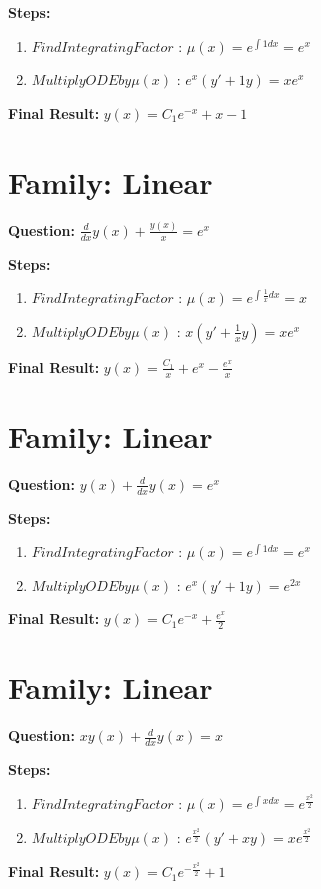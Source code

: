 \documentclass{article}
\begin{document}
\textbf{Steps:}
\begin{enumerate}
\item $Find Integrating Factor$ :  $\mu(x) = e^{\int 1 dx} = e^{x}$
\item $Multiply ODE by \mu(x)$ :  $e^{x}(y' + 1y) = x e^{x}$
\end{enumerate}
\textbf{Final Result:} $y{\left(x \right)} = C_{1} e^{- x} + x - 1$

\section*{Family: Linear}
\textbf{Question:} $\frac{d}{d x} y{\left(x \right)} + \frac{y{\left(x \right)}}{x} = e^{x}$

\textbf{Steps:}
\begin{enumerate}
\item $Find Integrating Factor$ :  $\mu(x) = e^{\int \frac{1}{x} dx} = x$
\item $Multiply ODE by \mu(x)$ :  $x(y' + \frac{1}{x}y) = x e^{x}$
\end{enumerate}
\textbf{Final Result:} $y{\left(x \right)} = \frac{C_{1}}{x} + e^{x} - \frac{e^{x}}{x}$

\section*{Family: Linear}
\textbf{Question:} $y{\left(x \right)} + \frac{d}{d x} y{\left(x \right)} = e^{x}$

\textbf{Steps:}
\begin{enumerate}
\item $Find Integrating Factor$ :  $\mu(x) = e^{\int 1 dx} = e^{x}$
\item $Multiply ODE by \mu(x)$ :  $e^{x}(y' + 1y) = e^{2 x}$
\end{enumerate}
\textbf{Final Result:} $y{\left(x \right)} = C_{1} e^{- x} + \frac{e^{x}}{2}$

\section*{Family: Linear}
\textbf{Question:} $x y{\left(x \right)} + \frac{d}{d x} y{\left(x \right)} = x$

\textbf{Steps:}
\begin{enumerate}
\item $Find Integrating Factor$ :  $\mu(x) = e^{\int x dx} = e^{\frac{x^{2}}{2}}$
\item $Multiply ODE by \mu(x)$ :  $e^{\frac{x^{2}}{2}}(y' + xy) = x e^{\frac{x^{2}}{2}}$
\end{enumerate}
\textbf{Final Result:} $y{\left(x \right)} = C_{1} e^{- \frac{x^{2}}{2}} + 1$
\end{document}
